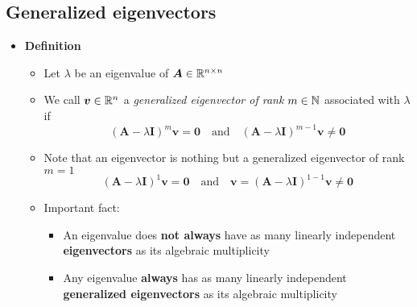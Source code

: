 \documentclass[12pt,a4paper]{article}
\begin{document}
\subsection{Generalized eigenvectors}

\begin{itemize}

\item \textbf{Definition}
  \begin{itemize}
    \item Let $\lambda$ be an eigenvalue of $\bm{A}\in \mathbb{R}^{n\times n}$
    \item We call $\bm{v}\in \mathbb{R}^{n}$ a \emph{generalized eigenvector of rank $m\in \mathbb{N}$} associated with $\lambda$ if
      \begin{equation}\nonumber%
        (\bm{A}-\lambda \bm{I})^{m}\bm{v} = \bm{0}
        \quad\text{and}\quad
        (\bm{A}-\lambda \bm{I})^{m-1}\bm{v} \neq \bm{0}
      \end{equation}
    \item Note that an eigenvector is nothing but a generalized eigenvector of rank $m=1$
      \begin{equation}\nonumber%
        (\bm{A}-\lambda \bm{I})^{1}\bm{v} = \bm{0}
        \quad\text{and}\quad
        \bm{v} = (\bm{A}-\lambda \bm{I})^{1-1}\bm{v} \neq \bm{0}
      \end{equation}
    \item Important fact:
      \begin{itemize}
      \item An eigenvalue does \textbf{not always} have as many linearly independent \textbf{eigenvectors} as its algebraic multiplicity
      \item Any eigenvalue \textbf{always} has as many linearly independent \textbf{generalized eigenvectors} as its algebraic multiplicity
      \end{itemize}
  \end{itemize}


\end{itemize}
\end{document}
